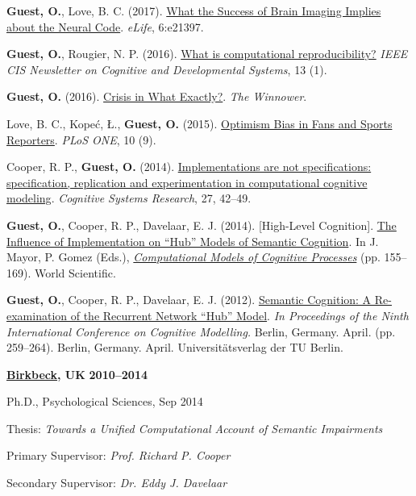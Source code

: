 \documentclass[10pt]{article}
\renewcommand{\section}[2]%
        {\pagebreak[2]\vspace{1.3\baselineskip}%
         \phantomsection\addcontentsline{toc}{section}{#1}%
         \hspace{0in}%
         \marginpar{
         \raggedright \
         
         \scshape #1}#2}
\newenvironment{outerlist}[1][\enskip\textbullet]%
        {\begin{itemize}[#1]}{\end{itemize}%
         \vspace{-.6\baselineskip}}
\newenvironment{innerlist}[1][\enskip\textbullet]%
        {\begin{compactitem}[#1]}{\end{compactitem}}
\begin{document}
\textbf{Guest, O.}, Love, B. C. (2017). \href{http://dx.d.oi.org/10.7554/eLife.21397}{What the Success of Brain Imaging Implies about the Neural Code}. \textit{eLife}, 6:e21397.
\vspace{5pt}

\textbf{Guest, O.}, Rougier, N. P. (2016). \href{http://oliviaguest.com/doc/guest_rougier_16.pdf}{What is computational reproducibility?} \textit{IEEE CIS Newsletter on Cognitive and Developmental Systems}, 13 (1).
\vspace{5pt}

\textbf{Guest, O.} (2016). \href{http://dx.doi.org/10.15200/winn.146590.01538}{Crisis in What Exactly?}. \textit{The Winnower}. 
\vspace{5pt}

Love, B. C., Kopeć, Ł., \textbf{Guest, O.} (2015). \href{http://dx.doi.org/10.1371/journal.pone.0137685}{Optimism Bias in Fans and Sports Reporters}. \textit{PLoS ONE}, 10 (9).
\vspace{5pt}

Cooper, R. P., \textbf{Guest, O.} (2014).  \href{http://dx.doi.org/10.1016/j.cogsys.2013.05.001}{Implementations are not specifications: specification, replication and experimentation in computational cognitive modeling}. \textit{Cognitive Systems Research}, 27, 42--49.
\vspace{5pt}

\textbf{Guest, O.}, Cooper, R. P., Davelaar, E. J. (2014).  [High-Level Cognition]. \href{http://oliviaguest.com/doc/guest_14.pdf}{The Influence of Implementation on ``Hub'' Models of Semantic Cognition}. In J. Mayor, P. Gomez (Eds.), \textit{\href{http://www.worldscientific.com/worldscibooks/10.1142/8747}{Computational Models of Cognitive Processes}} (pp. 155--169). World Scientific.
\vspace{5pt}

\textbf{Guest, O.}, Cooper, R. P., Davelaar, E. J. (2012). \href{http://eprints.bbk.ac.uk/6758/}{Semantic Cognition: A Re-examination of the Recurrent Network ``Hub'' Model}. \textit{In Proceedings of the Ninth International Conference on Cognitive Modelling.} Berlin, Germany. April. (pp. 259--264). Berlin, Germany. April. Universit\"{a}tsverlag der TU Berlin.

\section{EDUCATION}

\textbf{\href{http://www.bbk.ac.uk/}{Birkbeck}, UK} \hfill \textbf{2010--2014}
\begin{outerlist}
 \item[Ph.D., Psychological Sciences,] Sep 2014
        \begin{innerlist}
        \item Thesis: \emph{Towards a Unified Computational Account of Semantic Impairments}
	    \item Primary Supervisor: \emph{Prof. Richard P. Cooper}
        \item Secondary Supervisor: \emph{Dr. Eddy J. Davelaar}
        \end{innerlist}
\end{outerlist}
\vspace{10pt}
\end{document}
